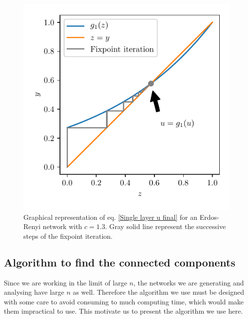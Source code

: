 \documentclass[
11pt, %
english, %
singlespacing, %
nolistspacing, %
liststotoc, %
headsepline, %
]{MastersDoctoralThesis} %
\begin{document}
\begin{figure}
	\includegraphics[scale=1]{u_solution_graphically.pdf}
	\caption{Graphical representation of eq. \eqref{Single layer u final} for an Erdos-Renyi network with $c = 1.3$. Gray solid line represent the successive steps of the fixpoint iteration.}
	\label{Figure: Solution of of u = g1(u) graphically}
\end{figure}

\subsection{Algorithm to find the connected components}
\label{Section: Algorithm to find the GCC}

Since we are working in the limit of large $n$, the networks we are generating and analysing have large $n$ as well. Therefore the algorithm we use must be designed with some care to avoid consuming to much computing time, which would make them impractical to use. This motivate us to present the algorithm we use here.
\end{document}
